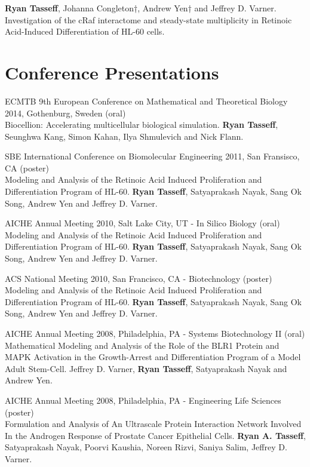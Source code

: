 \documentclass[margin,line]{res}
\begin{document}
\begin{resume}
{\bf Ryan Tasseff}, Johanna Congleton†, Andrew Yen† and Jeffrey D. Varner.
Investigation of the cRaf interactome and steady-state multiplicity in 
Retinoic Acid-Induced Differentiation of HL-60 cells.

\section{\sc Conference Presentations}
ECMTB 9th European Conference on Mathematical and Theoretical Biology 2014, Gothenburg, Sweden (oral) \\
Biocellion: Accelerating multicellular biological simulation.
{\bf Ryan Tasseff}, Seunghwa Kang, Simon Kahan, Ilya Shmulevich and Nick Flann.

SBE International Conference on Biomolecular Engineering 2011, San Fransisco, CA (poster)\\
Modeling and Analysis of the Retinoic Acid Induced Proliferation and Differentiation Program of HL-60.
{\bf Ryan Tasseff}, Satyaprakash Nayak, Sang Ok Song, Andrew Yen and Jeffrey D. Varner.

AICHE Annual Meeting 2010, Salt Lake City, UT - In Silico Biology (oral) \\
Modeling and Analysis of the Retinoic Acid Induced Proliferation and Differentiation Program of HL-60.
{\bf Ryan Tasseff}, Satyaprakash Nayak, Sang Ok Song, Andrew Yen and Jeffrey D. Varner.

ACS National Meeting 2010, San Francisco, CA - Biotechnology (poster)\\
Modeling and Analysis of the Retinoic Acid Induced Proliferation and Differentiation Program of HL-60.
{\bf Ryan Tasseff}, Satyaprakash Nayak, Sang Ok Song, Andrew Yen and Jeffrey D. Varner.

AICHE Annual Meeting 2008, Philadelphia, PA - Systems Biotechnology II (oral)\\
Mathematical Modeling and Analysis of the Role of the BLR1 Protein and MAPK Activation 
in the Growth-Arrest and Differentiation Program of a Model Adult Stem-Cell.
Jeffrey D. Varner, {\bf Ryan Tasseff}, Satyaprakash Nayak and Andrew Yen.

AICHE Annual Meeting 2008, Philadelphia, PA - Engineering Life Sciences (poster)\\
Formulation and Analysis of An Ultrascale Protein Interaction Network Involved In the Androgen Response of 
Prostate Cancer Epithelial Cells.
{\bf Ryan A. Tasseff}, Satyaprakash Nayak, Poorvi Kaushia, Noreen Rizvi, Saniya Salim, Jeffrey D. Varner.


\end{resume}
\end{document}
